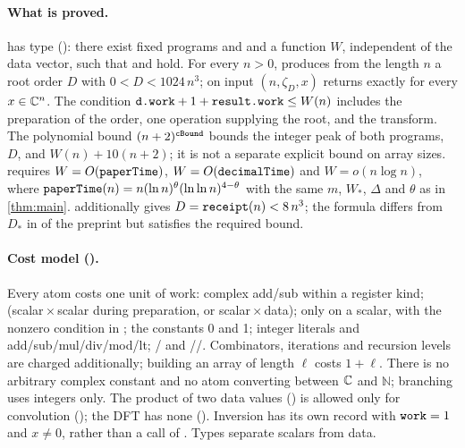 \documentclass[11pt]{article}
\theoremstyle{plain}
\begin{document}
\paragraph{What is proved.}
 has type  (): there exist fixed programs  and  and a function $W$, independent of the data vector, such that  and  hold. For every $n>0$,  produces from the length $n$ a root order $D$ with $0<D<1024\,n^3$;  on input $(n,\zeta_D,x)$ returns exactly  for every $x\in\mathbb{C}^n$. The condition $\texttt{d.work}+1+\texttt{result.work}\le W(n)$ includes the preparation of the order, one operation supplying the root, and the transform. The polynomial bound $(n+2)^{\texttt{cBound}}$ bounds the integer peak of both programs, $D$, and $W(n)+10(n+2)$; it is not a separate explicit bound on array sizes.  requires $W=O(\texttt{paperTime})$, $W=O(\texttt{decimalTime})$ and $W=o(n\log n)$, where $\texttt{paperTime}(n)=n(\ln n)^{\theta}(\ln\ln n)^{4-\theta}$ with the same $m$, $W_*$, $\Delta$ and $\theta$ as in \cref{thm:main}.  additionally gives $D=\texttt{receipt}(n)<8\,n^3$; the formula  differs from $D_*$ in  of the preprint but satisfies the required bound.

\paragraph{Cost model ().}
Every atom costs one unit of work: complex add/sub within a register kind;  (scalar${}\times{}$scalar during preparation, or scalar${}\times{}$data);  only on a scalar, with the nonzero condition in ; the constants 0 and 1; integer literals and add/sub/mul/div/mod/lt; / and //. Combinators, iterations and recursion levels are charged additionally; building an array of length $\ell$ costs $1+\ell$. There is no arbitrary complex constant and no atom converting between $\mathbb{C}$ and $\mathbb N$; branching uses integers only. The product of two data values () is allowed only for convolution (); the DFT has none (). Inversion has its own record with $\texttt{work}=1$ and  $x\ne0$, rather than a call of . Types separate scalars from data.
\end{document}
